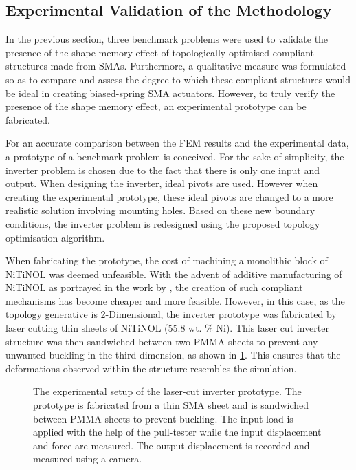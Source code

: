 \subsection{Experimental Validation of the Methodology}
In the previous section, three benchmark problems were used to validate the presence of the shape memory effect of topologically optimised compliant structures made from SMAs. Furthermore, a qualitative measure was formulated so as to compare and assess the degree to which these compliant structures would be ideal in creating biased-spring SMA actuators. However, to truly verify the presence of the shape memory effect, an experimental prototype can be fabricated.

For an accurate comparison between the FEM results and the experimental data, a prototype of a benchmark problem is conceived. For the sake of simplicity, the inverter problem is chosen due to the fact that there is only one input and output. When designing the inverter, ideal pivots are used. However when creating the experimental prototype, these ideal pivots are changed to a more realistic solution involving mounting holes. Based on these new boundary conditions, the inverter problem is redesigned using the proposed topology optimisation algorithm.

When fabricating the prototype, the cost of machining a monolithic block of NiTiNOL was deemed unfeasible. With the advent of additive manufacturing of NiTiNOL as portrayed in the work by \cite{sabahiReviewAdditiveManufacturing2020}, the creation of such compliant mechanisms has become cheaper and more feasible. However, in this case, as the topology generative is 2-Dimensional, the inverter prototype was fabricated by laser cutting thin sheets of NiTiNOL (55.8 wt. \% Ni). This laser cut inverter structure was then sandwiched between two PMMA sheets to prevent any unwanted buckling in the third dimension, as shown in \cref{fig:inverter-proto-setup}. This ensures that the deformations observed within the structure resembles the simulation.

\begin{figure}[t!]
    \centering
    \resizebox{\textwidth}{!}{}
    \caption[The experimental setup of the laser-cut inverter prototype]{The experimental setup of the laser-cut inverter prototype. The prototype is fabricated from a thin SMA sheet and is sandwiched between PMMA sheets to prevent buckling. The input load is applied with the help of the pull-tester while the input displacement and force are measured. The output displacement is recorded and measured using a camera.}
    \label{fig:inverter-proto-setup}
\end{figure}

